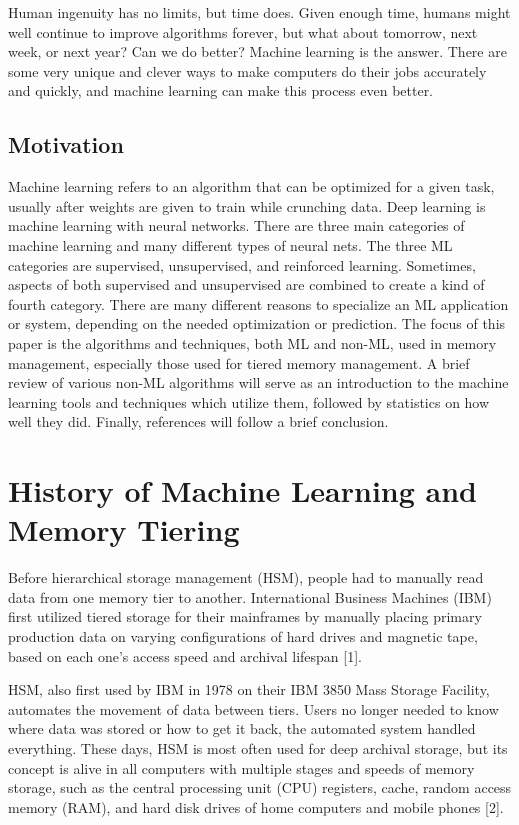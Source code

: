 \documentclass[conference]{IEEEtran}
\begin{document}
Human ingenuity has no limits, but time does.  Given enough time, humans might well continue to
improve algorithms forever, but what about tomorrow, next week, or next year?  Can we do better? 
Machine learning is the answer.  There are some very unique and clever ways to make computers do
their jobs accurately and quickly, and machine learning can make this process even better. 

\subsection{Motivation}

Machine learning refers to an algorithm that can be optimized for a given task, usually after weights are given to train while crunching data.  Deep learning is machine learning with neural networks.  There are three main categories of machine learning and many different types of neural nets.  The three ML categories are supervised, unsupervised, and reinforced learning.  Sometimes, aspects of both supervised and unsupervised are combined to create a kind of fourth category.  There are many different reasons to specialize an ML application or system, depending on the needed optimization or prediction.  The focus of this paper is the algorithms and techniques, both ML and non-ML, used in memory management, especially those used for tiered memory management.  A brief review of various non-ML algorithms will serve as an introduction to the machine learning tools and techniques which utilize them, followed by statistics on how well they did.  Finally, references will follow a brief conclusion. 

\section{History of Machine Learning and Memory Tiering}

Before hierarchical storage management (HSM), people had to manually read data from one memory tier to another.  International Business Machines (IBM) first utilized tiered storage for their mainframes by manually placing primary production data on varying configurations of hard drives and magnetic tape, based on each one's access speed and archival lifespan [1]. 

HSM, also first used by IBM in 1978 on their IBM 3850 Mass Storage Facility, automates the movement of data between tiers.  Users no longer needed to know where data was stored or how to get it back, the automated system handled everything.  These days, HSM is most often used for deep archival storage, but its concept is alive in all computers with multiple stages and speeds of memory storage, such as the central processing unit (CPU) registers, cache, random access memory (RAM), and hard disk drives of home computers and mobile phones [2]. 
\end{document}
